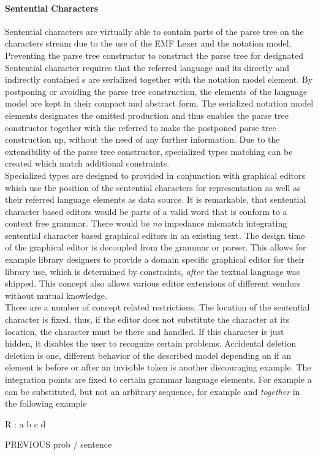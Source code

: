 \paragraph{Sentential Characters}
Sentential characters are virtually able to contain parts of the parse tree on the characters stream due to the use of the EMF Lexer and the notation model. Preventing the parse tree constructor to construct the parse tree for designated Sentential character requires that the referred language  and its directly and indirectly contained s are serialized together with the notation model element. By postponing or avoiding the parse tree construction, the elements of the language model are kept in their compact and abstract form. The serialized notation model elements designates the omitted production and thus enables the parse tree constructor together with the referred  to make the postponed parse tree construction up, without the need of any further information. Due to the extensibility of the parse tree constructor, specialized types matching can be created which match additional constraints.  \\
Specialized types are designed to provided in conjunction with graphical editors which use the position of the sentential characters for representation as well as their referred language elements as data source. It is remarkable, that sentential character based editors would be parts of a valid word that is conform to a context free grammar. There would be \emph{no} impedance mismatch integrating sentential character based graphical editors in an existing text. The design time of the graphical editor is decoupled from the grammar or parser. This allows for example library designers to provide a domain specific graphical editor for their library use, which is determined by constraints, \emph{after} the textual language was shipped. This concept also allows various editor extensions of different vendors without mutual knowledge.\\
There are a number of concept related restrictions. The location of the sentential character is fixed, thus, if the editor does not substitute the character at its location, the character must be there and handled. If this character is just hidden, it disables the user to recognize certain problems. Accidental deletion deletion is one, different behavior of the described model depending on if an element is before or after an invisible token is another discouraging example. The integration points are fixed to certain grammar language elements. For example a  can be substituted, but not an arbitrary sequence, for example  and  \emph{together} in the following example\\
\begin{xtxt}
R : a b c d
\end{xtxt}
PREVIOUS prob / sentence

